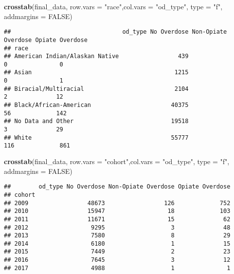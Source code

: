 \documentclass[]{article}
\newenvironment{Shaded}{\begin{snugshade}}{\end{snugshade}}
\newcommand{\KeywordTok}[1]{\textcolor[rgb]{0.13,0.29,0.53}{\textbf{#1}}}
\newcommand{\DataTypeTok}[1]{\textcolor[rgb]{0.13,0.29,0.53}{#1}}
\newcommand{\StringTok}[1]{\textcolor[rgb]{0.31,0.60,0.02}{#1}}
\newcommand{\OtherTok}[1]{\textcolor[rgb]{0.56,0.35,0.01}{#1}}
\newcommand{\NormalTok}[1]{#1}
\begin{document}
\begin{Shaded}
\begin{Highlighting}[]
\KeywordTok{crosstab}\NormalTok{(final_data, }\DataTypeTok{row.vars =} \StringTok{"race"}\NormalTok{,}\DataTypeTok{col.vars =} \StringTok{"od_type"}\NormalTok{, }\DataTypeTok{type =} \StringTok{"f"}\NormalTok{, }\DataTypeTok{addmargins =} \OtherTok{FALSE}\NormalTok{)}
\end{Highlighting}
\end{Shaded}

\begin{verbatim}
##                                od_type No Overdose Non-Opiate Overdose Opiate Overdose
## race                                                                                  
## American Indian/Alaskan Native                 439                   0               0
## Asian                                         1215                   0               1
## Biracial/Multiracial                          2104                   2              12
## Black/African-American                       40375                  56             142
## No Data and Other                            19518                   3              29
## White                                        55777                 116             861
\end{verbatim}

\begin{Shaded}
\begin{Highlighting}[]
\KeywordTok{crosstab}\NormalTok{(final_data, }\DataTypeTok{row.vars =} \StringTok{"cohort"}\NormalTok{,}\DataTypeTok{col.vars =} \StringTok{"od_type"}\NormalTok{, }\DataTypeTok{type =} \StringTok{"f"}\NormalTok{, }\DataTypeTok{addmargins =} \OtherTok{FALSE}\NormalTok{)}
\end{Highlighting}
\end{Shaded}

\begin{verbatim}
##        od_type No Overdose Non-Opiate Overdose Opiate Overdose
## cohort                                                        
## 2009                 48673                 126             752
## 2010                 15947                  18             103
## 2011                 11671                  15              62
## 2012                  9295                   3              48
## 2013                  7580                   8              29
## 2014                  6180                   1              15
## 2015                  7449                   2              23
## 2016                  7645                   3              12
## 2017                  4988                   1               1
\end{verbatim}
\end{document}
